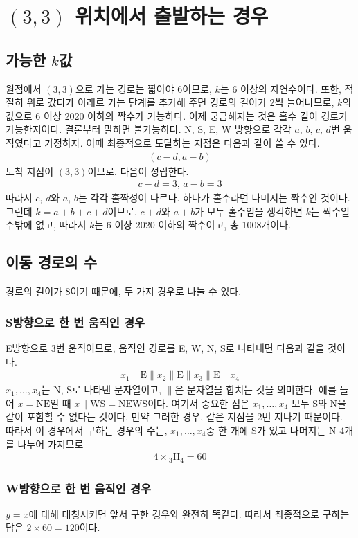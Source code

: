 \documentclass{scrartcl}
\newcommand{\repcombi}[2]{{}_{#1}\mathrm{H}_{#2}}
\begin{document}
\section{\texorpdfstring{\((3, 3)\)}{(3, 3)} 위치에서 출발하는 경우}
\subsection{가능한 \texorpdfstring{\(k\)}{k}값}
원점에서 \((3, 3)\)으로 가는 경로는 짧아야 6이므로, \(k\)는 6 이상의 자연수이다. 또한, 적절히 위로 갔다가 아래로 가는 단계를 추가해 주면 경로의 길이가 2씩 늘어나므로, \(k\)의 값으로 6 이상 2020 이하의 짝수가 가능하다. 이제 궁금해지는 것은 홀수 길이 경로가 가능한지이다. 결론부터 말하면 불가능하다. N, S, E, W 방향으로 각각 \(a,\,b,\,c,\,d\)번 움직였다고 가정하자. 이때 최종적으로 도달하는 지점은 다음과 같이 쓸 수 있다.
\begin{align*}
  (c-d,a-b)
\end{align*}
도착 지점이 \((3, 3)\)이므로, 다음이 성립한다.
\begin{align*}
  c-d=3,\,a-b=3
\end{align*}
따라서 \(c,\,d\)와 \(a,\,b\)는 각각 홀짝성이 다르다. 하나가 홀수라면 나머지는 짝수인 것이다. 그런데 \(k=a+b+c+d\)이므로, \(c+d\)와 \(a+b\)가 모두 홀수임을 생각하면 \(k\)는 짝수일 수밖에 없고, 따라서 \(k\)는 6 이상 2020 이하의 짝수이고, 총 1008개이다.

\subsection{이동 경로의 수}
경로의 길이가 8이기 때문에, 두 가지 경우로 나눌 수 있다.

\subsubsection{S방향으로 한 번 움직인 경우}
E방향으로 3번 움직이므로, 움직인 경로를 E, W, N, S로 나타내면 다음과 같을 것이다.
\begin{align*}
  x_1\|\mathrm{E}\|x_2\|\mathrm{E}\|x_3\|\mathrm{E}\|x_4
\end{align*}
\(x_1, \dots, x_4\)는 N, S로 나타낸 문자열이고, \(\|\)은 문자열을 합치는 것을 의미한다. 예를 들어 \(x=\mathrm{NE}\)일 때 \(x\|\mathrm{WS}=\mathrm{NEWS}\)이다. 여기서 중요한 점은 \(x_1,\dots,x_4\) 모두 S와 N을 같이 포함할 수 없다는 것이다. 만약 그러한 경우, 같은 지점을 2번 지나기 때문이다. 따라서 이 경우에서 구하는 경우의 수는, \(x_1, \dots, x_4\)중 한 개에 S가 있고 나머지는 N 4개를 나누어 가지므로
\begin{align*}
  4\times\repcombi{3}{4}=60
\end{align*}

\subsubsection{W방향으로 한 번 움직인 경우}
\(y=x\)에 대해 대칭시키면 앞서 구한 경우와 완전히 똑같다. 따라서 최종적으로 구하는 답은 \(2\times 60=120\)이다.
\end{document}
